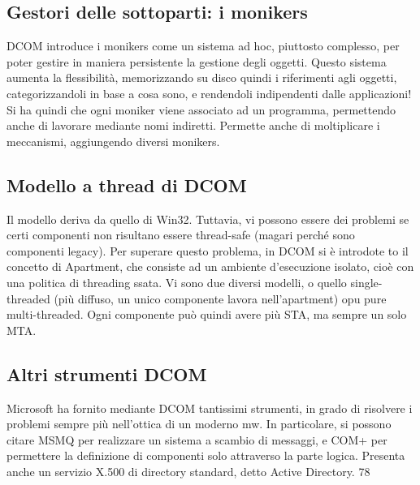 \subsection{Gestori delle sottoparti: i monikers}
DCOM introduce i monikers come un sistema ad hoc, piuttosto complesso, per
poter gestire in maniera persistente la gestione degli oggetti. Questo sistema
aumenta la flessibilità, memorizzando su disco quindi i riferimenti agli oggetti,
categorizzandoli in base a cosa sono, e rendendoli indipendenti dalle applicazioni!
Si ha quindi che ogni moniker viene associato ad un programma, permettendo
anche di lavorare mediante nomi indiretti. Permette anche di moltiplicare i
meccanismi, aggiungendo diversi monikers.
\subsection{Modello a thread di DCOM}
Il modello deriva da quello di Win32. Tuttavia, vi possono essere dei problemi se certi componenti non risultano essere
thread-safe (magari perché sono
componenti legacy). Per superare questo problema, in DCOM si è introdote
to il concetto di Apartment, che consiste ad un ambiente d'esecuzione isolato,
cioè con una politica di threading ssata. Vi sono due diversi modelli, o quello
single-threaded (più diffuso, un unico componente lavora nell'apartment) opu
pure multi-threaded. Ogni componente può quindi avere più STA, ma sempre
un solo MTA.
\subsection{Altri strumenti DCOM}
Microsoft ha fornito mediante DCOM tantissimi strumenti, in grado di risolvere
i problemi sempre più nell'ottica di un moderno mw.
In particolare, si possono citare MSMQ per realizzare un sistema a scambio di
messaggi, e COM+ per permettere la definizione di componenti solo attraverso
la parte logica. Presenta anche un servizio X.500 di directory standard, detto
Active Directory.
78
